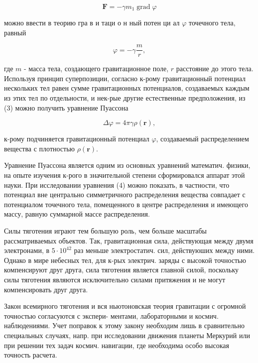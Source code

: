 \documentclass[10pt]{article}
\begin{document}
\[

\boldsymbol{F}=-\gamma m_{1} \operatorname{grad} \varphi

\]



можно ввести в теорию гра в и таци о н ный потен ци ал $\varphi$ точечного тела, равный



\[

\varphi=-\gamma \frac{m}{r},

\]



где $m$ - масса тела, создающего гравитационное поле, $r$ расстояние до этого тела. Используя принцип суперпозиции, согласно к-рому гравитационный потенциал нескольких тел равен сумме гравитационных потенциалов, создаваемых каждым из этих тел по отдельности, и нек-рые другие естественные предположения, из (3) можно получить уравнение Пуассона



\[

\Delta \varphi=4 \pi \gamma \rho(\boldsymbol{r}),

\]



к-рому подчиняется гравитационный потенциал $\varphi$, создаваемый распределением вещества с плотностью $\rho(\boldsymbol{r})$.



Уравнение Пуассона является одним из основных уравнений математич. физики, на опыте изучения к-рого в значительной степени сформировался аппарат этой науки. При исследовании уравнения (4) можно показать, в частности, что потенциал вне центрально симметричного распределения вещества совпадает с потенциалом точечного тела, помещенного в центре распределения и имеющего массу, равную суммарной массе распределения.



Силы тяготения играют тем большую роль, чем больше масштабы рассматриваемых объектов. Так, гравитационная сила, действующая между двумя электронами, в $5 \cdot 10^{42}$ раз меньше электростатич. сил, действуюших между ними. Однако в мире небесных тел, для к-рых электрич. заряды с высокой точностью компенсируют друг друга, сила тяготения является главной силой, поскольку силы тяготения являются исключительно силами притяжения и не могут компенсировать друг друга.



Закон всемирного тяготения и вся ньютоновская теория гравитации с огромной точностью согласуются с экспери- ментами, лабораторными и космич. наблюдениями. Учет поправок к этому закону необходим лишь в сравнительно специальных случаях, напр. при исследовании движения планеты Меркурий или при решении тех задач космич. навигации, где необходима особо высокая точность расчета.
\end{document}
